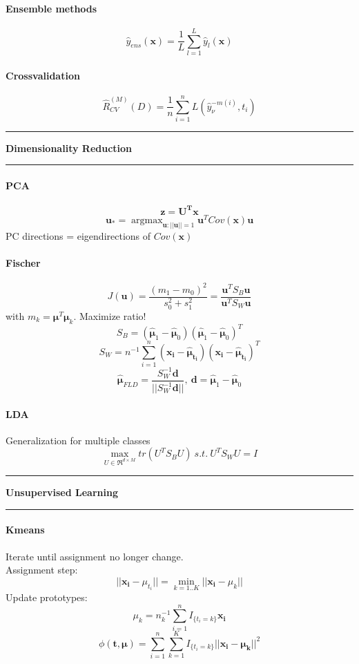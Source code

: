 \documentclass[7pt]{scrartcl}
\newlength{\secskip}
\renewcommand{\section}[1]{
  \vspace{\secskip}
  \hrule\vspace{.3em}
  \textbf{#1}
  \vspace{.3em}
  \hrule
  \vspace{\secskip}
}
\DeclareMathOperator*{\argmax}{argmax}
\renewcommand{\vec}{\mathbf}
\begin{document}
\begin{multicols}{4}
\paragraph{Ensemble methods}
\[\hat{y}_{ens}(\vec{x}) = \frac{1}{L} \sum_{l=1}^L \hat{y}_l(\vec{x})\]
\paragraph{Crossvalidation}
\[\hat{R}_{CV}^{(M)}(D) = \frac{1}{n}\sum_{i=1}^n L(\hat{y}_\nu^{-m(i)},t_i)\]

\section{Dimensionality Reduction}
\paragraph{PCA}
\[\vec{z = U^T x}\]
\[\vec{u}_* = \argmax_{\vec{u}:||\vec{u}||=1} \vec{u}^T Cov(\vec{x}) \vec{u}\]
PC directions = eigendirections of $Cov(\vec{x})$
\paragraph{Fischer}
\[J(\vec{u}) = \frac{(m_1 - m_0)^2}{s_0^2 + s_1^2} = \frac{\vec{u}^T S_B \vec{u}}{\vec{u}^T S_W \vec{u}}\]
with $m_k = \vec{\mu}^T \vec{\mu}_k$. Maximize ratio!
\[S_B = (\hat{\vec{\mu}}_1 -\hat{\vec{\mu}}_0)(\hat{\vec{\mu}}_1 -\hat{\vec{\mu}}_0)^T\]
\[S_W = n^{-1} \sum_{i=1}^n(\vec{x_i} - \vec{\hat{\mu}_{t_i}})(\vec{x_i} - \vec{\hat{\mu}_{t_i}})^T\]
\[\vec{\hat{\mu}}_{FLD} = \frac{S_W^{-1} \vec{d}}{||S_W^{-1} \vec{d}||}, ~ \vec{d} = \hat{\vec{\mu}}_1 -\hat{\vec{\mu}}_0\]
\paragraph{LDA}
Generalization for multiple classes
\[\max_{U \in \Re^{d \times M}} tr(U^T S_B U) ~s.t.~ U^T S_WU = I\]

\section{Unsupervised Learning}
\paragraph{Kmeans}
Iterate until assignment no longer change.\\
Assignment step: \\
\[||\vec{x_i} - \mu_{t_i}|| = \min_{k=1..K} || \vec{x_i} - \mu_{k}||\]
Update prototypes: \\
\[\mu_k = n_k^{-1} \sum_{i=1}^n I_{\{t_i=k\}}\vec{x_i}\]
\[\phi(\vec{t,\mu}) = \sum_{i=1}^n\sum_{k=1}^K I_{\{t_i=k\}} || \vec{x_i} - \vec{\mu_k} || ^2\]

\end{multicols}
\end{document}
